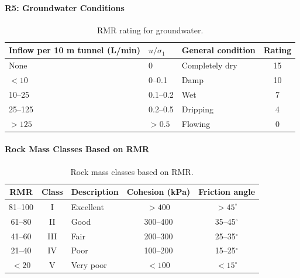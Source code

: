 \paragraph{R5: Groundwater Conditions}

\begin{table}[H]
\centering
\small
\begin{tabularx}{\textwidth}{l l l c}
\toprule
\textbf{Inflow per 10 m tunnel (L/min)} & \textbf{\(u/\sigma_1\)} & \textbf{General condition} & \textbf{Rating} \\
\midrule
None & 0 & Completely dry & 15 \\
\(<10\) & 0--0.1 & Damp & 10 \\
10--25 & 0.1--0.2 & Wet & 7 \\
25--125 & 0.2--0.5 & Dripping & 4 \\
\(>125\) & \(>0.5\) & Flowing & 0 \\
\bottomrule
\end{tabularx}
\caption{RMR rating for groundwater.}
\label{tab:rmr_groundwater}
\end{table}

\paragraph{Rock Mass Classes Based on RMR}

\begin{table}[H]
\centering
\small
\begin{tabular}{c c l c c}
\toprule
\textbf{RMR} & \textbf{Class} & \textbf{Description} & \textbf{Cohesion (kPa)} & \textbf{Friction angle} \\
\midrule
81--100 & I & Excellent & \(>400\) & \(>45^\circ\) \\
61--80 & II & Good & 300--400 & 35--45\(^{\circ}\) \\
41--60 & III & Fair & 200--300 & 25--35\(^{\circ}\) \\
21--40 & IV & Poor & 100--200 & 15--25\(^{\circ}\) \\
\(<20\) & V & Very poor & \(<100\) & \(<15^\circ\) \\
\bottomrule
\end{tabular}
\caption{Rock mass classes based on RMR.}
\label{tab:rmr_classes}
\end{table}


